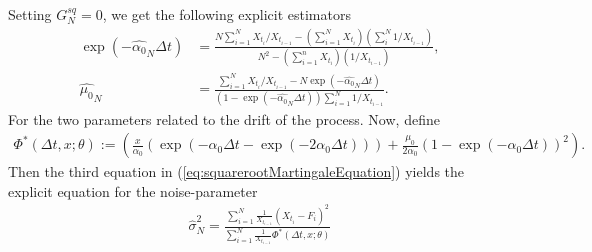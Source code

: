 Setting $G_N^{sq} = 0$, we get the following explicit estimators
\begin{align}
    \exp\left(-\hat{\alpha_0}_N\Delta t\right) &= \frac{N\sum_{i=1}^{N}X_{t_i} / X_{t_{i - 1}} - \left(\sum_{i = 1}^{N}X_{t_i}\right)\left(\sum_{i}^{N}1/X_{t_{i - 1}}\right)}{N^2 - \left(\sum_{i = 1}^{n}X_{t_i}\right)\left(1/X_{t_{i - 1}}\right)},\\
    \hat{\mu_0}_N &= \frac{\sum_{i = 1}^{N}X_{t_i} / X_{t_{i - 1}} - N \exp\left(-\hat{\alpha_0}_N\Delta t\right)}{\left(1-\exp\left(-\hat{\alpha_0}_N\Delta t\right)\right)\sum_{i = 1}^{N}1/X_{t_{i - 1}}}.
\end{align}
For the two parameters related to the drift of the process. Now, define
\begin{align}
    \Phi^*(\Delta t, x; \theta) := \left(\frac{x}{\alpha_0}\left(\exp\left(-\alpha_0\Delta t - \exp\left(-2\alpha_0 \Delta t\right)\right)\right) + \frac{\mu_0}{2\alpha_0}\left(1-\exp\left(-\alpha_0\Delta t\right)\right)^2\right).
\end{align}
Then the third equation in (\ref{eq:squarerootMartingaleEquation}) yields the explicit equation for the noise-parameter
\begin{align}
    \hat{\sigma}^2_N = \frac{\sum_{i = 1}^{N}\frac{1}{X_{t_{i - 1}}}\left(X_{t_i} - F_i\right)^2}{\sum_{i = 1}^{N}\frac{1}{X_{t_{i - 1}}}\Phi^*(\Delta t, x; \theta)}
\end{align}
